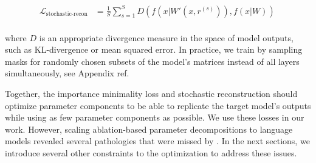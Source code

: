 \documentclass{article}
\begin{document}
\begin{equation}\label{eq:random_recon}
\begin{aligned}
\mathcal{L}_{\text{stochastic-recon}}&=\frac{1}{S}\sum^S_{s=1}D \left( f(x\vert W'(x,r^{(s)})),f(x\vert W) \right)\,\\
\end{aligned}
\end{equation}

where $D$ is an appropriate divergence measure in the space of model outputs, such as KL-divergence or mean squared error. In practice, we train by sampling masks for randomly chosen subsets of the model's matrices instead of all layers simultaneously, see Appendix ref.

Together, the importance minimality loss and stochastic reconstruction should optimize parameter components to be able to replicate the target model's outputs while using as few parameter components as possible. We use these losses in our work. However, scaling ablation-based parameter decompositions to language models revealed several pathologies that were missed by \cite{bushnaq2025spd}. In the next sections, we introduce several other constraints to the optimization to address these issues.
\end{document}
